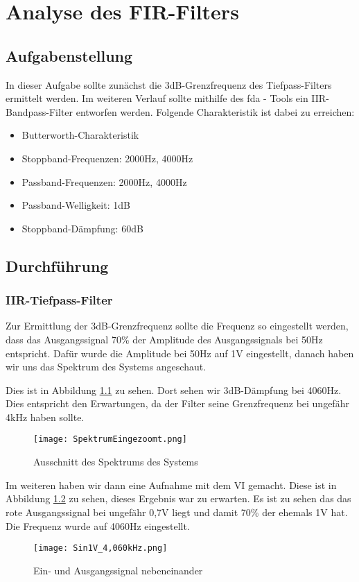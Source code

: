 \chapter{Analyse des FIR-Filters}
\section{Aufgabenstellung}
In dieser Aufgabe sollte zunächst die 3dB-Grenzfrequenz des Tiefpass-Filters ermittelt werden.
Im weiteren Verlauf sollte mithilfe des \gls{fda} - Tools ein IIR-Bandpass-Filter entworfen werden.
Folgende Charakteristik ist dabei zu erreichen:
\begin{itemize}
\item Butterworth-Charakteristik
\item Stoppband-Frequenzen: 2000Hz, 4000Hz
\item Passband-Frequenzen: 2000Hz, 4000Hz
\item Passband-Welligkeit: 1dB
\item Stoppband-Dämpfung: 60dB
\end{itemize}
\section{Durchf\"uhrung}
\subsection*{IIR-Tiefpass-Filter}
Zur Ermittlung der 3dB-Grenzfrequenz sollte die Frequenz so eingestellt werden, dass das Ausgangssignal 70\% der Amplitude des Ausgangssignals bei 50Hz entspricht.
Dafür wurde die Amplitude bei 50Hz auf 1V eingestellt, danach haben wir uns das Spektrum des Systems angeschaut.\\\par Dies ist in Abbildung \ref{fig:SprektrumZoomSystem} zu sehen. Dort sehen wir 3dB-Dämpfung bei 4060Hz. Dies entspricht den Erwartungen, da der Filter seine Grenzfrequenz bei ungefähr 4kHz haben sollte. 
\begin{figure}[H]
  \centering
    \texttt{[image: SpektrumEingezoomt.png]}
  \caption{Ausschnitt des Spektrums des Systems}
  \label{fig:SprektrumZoomSystem}
\end{figure}


Im weiteren haben wir dann eine Aufnahme mit dem VI gemacht. Diese ist in Abbildung \ref{fig:4060HzScope} zu sehen, dieses Ergebnis war zu erwarten. Es ist zu sehen das das rote Ausgangssignal bei ungefähr 0,7V liegt und damit 70\% der ehemals 1V hat. Die Frequenz wurde auf 4060Hz eingestellt.
\begin{figure}[H]
  \centering
    \texttt{[image: Sin1V\_4,060kHz.png]}
  \caption{Ein- und Ausgangssignal nebeneinander}
  \label{fig:4060HzScope}
\end{figure}

